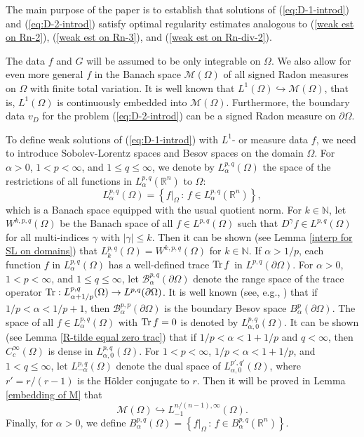 \documentclass[reqno,centertags,11pt]{amsart}
\theoremstyle{definition}
\numberwithin{thm}{section}
\numberwithin{equation}{section}
\newcommand{\N}{{\mathbb{N}}}
\newcommand{\R}{{\mathbb{R}}}
\begin{document}
The main purpose of the paper is to establish  that   solutions of (\ref{eq:D-1-introd}) and  (\ref{eq:D-2-introd}) satisfy optimal   regularity  estimates analogous to (\ref{weak est on Rn-2}), (\ref{weak est on Rn-3}),   and (\ref{weak est on Rn-div-2}).

The data $f$ and  $G$  will be assumed to be only integrable on $\Omega$. We also  allow for even more general $f$ in the Banach space  $\mathcal{M}  (\Omega )$ of all signed  Radon measures   on $\Omega$ with finite total variation. It is well known that $L^1 (\Omega ) \hookrightarrow \mathcal{M}  (\Omega )$, that is,   $L^1 (\Omega )$ is continuously    embedded into $ \mathcal{M}  (\Omega )$.
Furthermore, the boundary data $v_D$ for the problem (\ref{eq:D-2-introd}) can be a signed Radon measure on $\partial \Omega$.


To define weak   solutions of (\ref{eq:D-1-introd})   with $L^1$-  or measure data $f$, we need to introduce Sobolev-Lorentz spaces and Besov spaces on the domain $\Omega$.
For $\alpha>0$,  $1 < p< \infty$, and $1 \le q \le \infty$, we denote by $L_\alpha^{p,q}(\Omega ) $ the space of the restrictions of all functions in $L_\alpha^{p,q}(\R^n)$ to $\Omega$:
$$
L_\alpha^{p,q}(\Omega ) = \left\{ f|_{\Omega}\,:\, f \in L_\alpha^{p,q}(\R^n ) \right\},
$$
which is a Banach space equipped with the usual quotient norm.
For $k \in \N$,   let $W^{k,p,q}(\Omega )$ be the Banach  space of   all $f \in L^{p,q}(\Omega )$ such that $D^\gamma f \in L^{p,q}(\Omega  )$ for all multi-indices $\gamma$ with $|\gamma| \le k$.
Then it can be shown (see Lemma \ref{interp for SL on domains}) that  $L_k^{p,q}(\Omega ) =W^{k,p,q}(\Omega ) $ for $k \in \N$.
If $\alpha >1/p$, each function $f$ in  $L_\alpha^{p,q}(\Omega )$ has a well-defined trace ${\rm Tr} \,f$ in $L^{p,q}(\partial\Omega )$. For $\alpha>0$, $1<p<\infty$, and $1\le q \le \infty$, let  $\mathcal B^{p,q}_{\alpha}(\partial \Omega )$ denote the range space of the trace operator ${\rm Tr}:  L_{\alpha+1/p}^{p,q} (\Omega )  \to L^{p,q}(\partial \Omega)$.
It is well known  (see, e.g.,  \cite[Theorem 3.1]{JK})  that if $1/p< \alpha < 1/p+1$, then $\mathcal B^{p,p}_{\alpha}(\partial \Omega )$ is the boundary Besov space $B_\alpha^{p}(\partial\Omega )$.
 The space of all $f \in L_\alpha^{p,q}(\Omega )$ with ${\rm Tr} \,f =0$ is denoted by $L_{\alpha,0}^{p,q}(\Omega )$.
It can be shown (see Lemma \ref{R-tilde equal zero trac}) that if $1/p< \alpha < 1+1/p$ and $q<\infty$, then $C_c^\infty (\Omega )$ is dense in $L_{\alpha,0}^{p,q}(\Omega )$. For $1<p<\infty$, $1/p< \alpha <1+1/p$, and $1< q \le \infty$, let $L_{-\alpha}^{p,q}(\Omega )$ denote the dual space of $L_{\alpha,0}^{p',q'}(\Omega )$, where $r'=r/(r-1)$ is the H\"{o}lder conjugate to $r$.  Then it will be proved   in  Lemma \ref{embedding of M}  that
\[
\mathcal{M}  (\Omega ) \hookrightarrow L_{-1}^{n/(n-1),\infty}(\Omega ).
\]
Finally, for $\alpha>0$, we define $B_\alpha^{p,q}(\Omega ) = \left\{ f|_{\Omega}\,:\, f \in B_\alpha^{p,q}(\R^n ) \right\}$.
\end{document}
